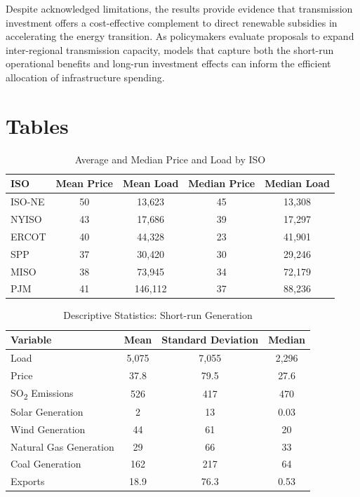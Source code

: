 \documentclass[12pt]{article}
\begin{document}
Despite acknowledged limitations, the results provide evidence that transmission investment offers a cost-effective complement to direct renewable subsidies in accelerating the energy transition. As policymakers evaluate proposals to expand inter-regional transmission capacity, models that capture both the short-run operational benefits and long-run investment effects can inform the efficient allocation of infrastructure spending.

\pagebreak

\singlespacing
\setlength\bibsep{0pt}
\printbibliography




\clearpage

\onehalfspacing

\section*{Tables} \label{sec:tab}

\begin{table}[htbp]
\centering
\begin{tabular}{lcccc}
\toprule
\textbf{ISO} & \textbf{Mean Price} & \textbf{Mean Load} & \textbf{Median Price} & \textbf{Median Load} \\
\midrule
ISO-NE & 50 & 13{,}623 & 45 & 13{,}308 \\
NYISO  & 43 & 17{,}686 & 39 & 17{,}297 \\
ERCOT  & 40 & 44{,}328 & 23 & 41{,}901 \\
SPP    & 37 & 30{,}420 & 30 & 29{,}246 \\
MISO   & 38 & 73{,}945 & 34 & 72{,}179 \\
PJM    & 41 & 146{,}112 & 37 & 88{,}236 \\
\bottomrule
\end{tabular}
\caption{Average and Median Price and Load by ISO}
\label{priceData}
\end{table}

\begin{table}[htbp]
\centering
\begin{tabular}{lccc}
\toprule
\textbf{Variable} & \textbf{Mean} & \textbf{Standard Deviation} & \textbf{Median} \\
\midrule
Load & 5{,}075 & 7{,}055 & 2{,}296 \\
Price & 37.8 & 79.5 & 27.6 \\
SO\textsubscript{2} Emissions & 526 & 417 & 470 \\
Solar Generation & 2 & 13 & 0.03 \\
Wind Generation & 44 & 61 & 20 \\
Natural Gas Generation & 29 & 66 & 33 \\
Coal Generation & 162 & 217 & 64 \\
Exports & 18.9 & 76.3 & 0.53 \\
\bottomrule
\end{tabular}
\caption{Descriptive Statistics: Short-run Generation}
\label{ShortTermStats1}
\end{table}
\end{document}
